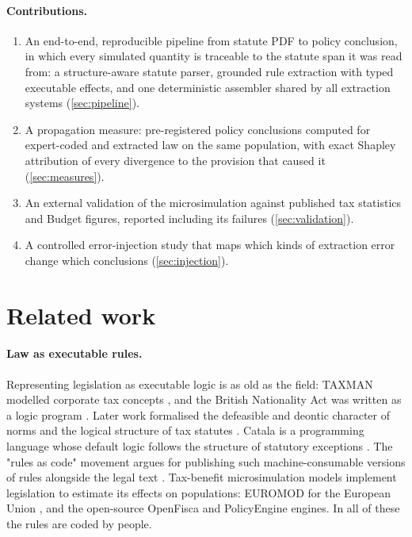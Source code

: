 \documentclass[sn-apa]{sn-jnl}
\begin{document}
\paragraph{Contributions.}
\begin{enumerate}
  \item An end-to-end, reproducible pipeline from statute PDF to policy
  conclusion, in which every simulated quantity is traceable to the statute
  span it was read from: a structure-aware statute parser, grounded rule
  extraction with typed executable effects, and one deterministic assembler
  shared by all extraction systems (\cref{sec:pipeline}).
  \item A propagation measure: pre-registered policy conclusions computed for
  expert-coded and extracted law on the same population, with exact Shapley
  attribution of every divergence to the provision that caused it
  (\cref{sec:measures}).
  \item An external validation of the microsimulation against published tax
  statistics and Budget figures, reported including its failures
  (\cref{sec:validation}).
  \item A controlled error-injection study that maps which kinds of extraction
  error change which conclusions (\cref{sec:injection}).
\end{enumerate}

\section{Related work}\label{sec:related}

\paragraph{Law as executable rules.}
Representing legislation as executable logic is as old as the field:
TAXMAN modelled corporate tax concepts \citep{mccarty1977taxman}, and the
British Nationality Act was written as a logic program
\citep{sergot1986british}. Later work formalised the defeasible and deontic
character of norms \citep{governatori2005representing} and the logical
structure of tax statutes \citep{lawsky2017logic}. Catala is a programming
language whose default logic follows the structure of statutory exceptions
\citep{merigoux2021catala}. The "rules as code" movement argues for
publishing such machine-consumable versions of rules alongside the legal
text \citep{mohun2020cracking}. Tax-benefit microsimulation models
implement legislation to estimate its effects on populations: EUROMOD for
the European Union \citep{sutherland2013euromod}, and the open-source
OpenFisca \citep{openfisca} and PolicyEngine \citep{ahmadi2026policyengine}
engines. In all of these the rules are coded by people.
\end{document}
